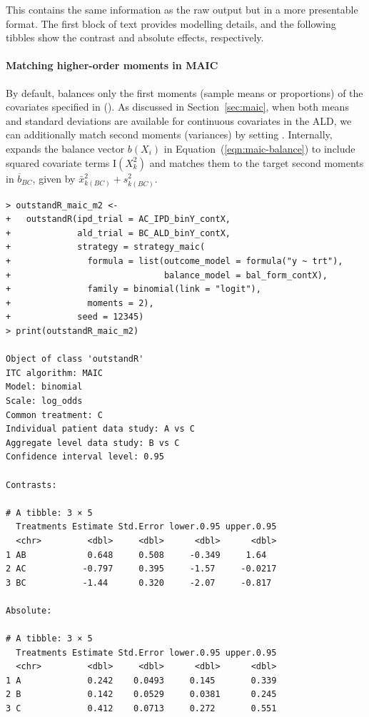 \documentclass[article]{jss}
\begin{document}
This contains the same information as the raw output but in a more presentable format. The first block of text provides modelling details, and the following tibbles show the contrast and absolute effects, respectively.

\paragraph{Matching higher-order moments in MAIC}
By default,  balances only the first moments (sample means or proportions) of the covariates specified in  (). As discussed in Section~\ref{sec:maic}, when both means and standard deviations are available for continuous covariates in the ALD, we can additionally match second moments (variances) by setting . Internally,  expands the balance vector $b(X_i)$ in Equation~(\ref{eqn:maic-balance}) to include squared covariate terms $\text{I}(X_k^2)$ and matches them to the target second moments in $\overline{b}_{BC}$, given by $\bar{x}_{k(BC)}^2 + s_{k(BC)}^2$.

\begin{verbatim}
> outstandR_maic_m2 <-
+   outstandR(ipd_trial = AC_IPD_binY_contX,
+             ald_trial = BC_ALD_binY_contX,
+             strategy = strategy_maic(
+               formula = list(outcome_model = formula("y ~ trt"),
+                              balance_model = bal_form_contX),
+               family = binomial(link = "logit"),
+               moments = 2),
+             seed = 12345)
> print(outstandR_maic_m2)

Object of class 'outstandR' 
ITC algorithm: MAIC 
Model: binomial 
Scale: log_odds 
Common treatment: C 
Individual patient data study: A vs C 
Aggregate level data study: B vs C 
Confidence interval level: 0.95 

Contrasts:

# A tibble: 3 × 5
  Treatments Estimate Std.Error lower.0.95 upper.0.95
  <chr>         <dbl>     <dbl>      <dbl>      <dbl>
1 AB            0.648     0.508     -0.349     1.64  
2 AC           -0.797     0.395     -1.57     -0.0217
3 BC           -1.44      0.320     -2.07     -0.817 

Absolute:

# A tibble: 3 × 5
  Treatments Estimate Std.Error lower.0.95 upper.0.95
  <chr>         <dbl>     <dbl>      <dbl>      <dbl>
1 A             0.242    0.0493     0.145       0.339
2 B             0.142    0.0529     0.0381      0.245
3 C             0.412    0.0713     0.272       0.551
\end{verbatim}
\end{document}
